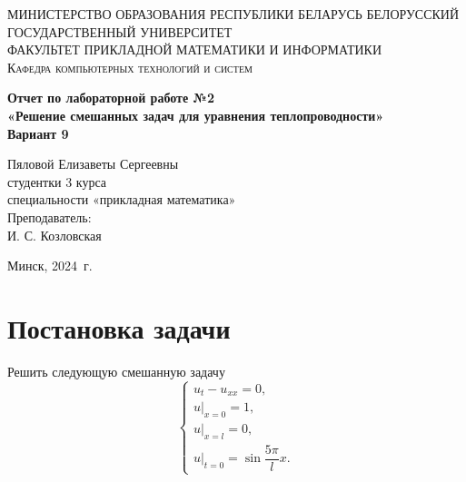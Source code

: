 \documentclass[a4paper, 12pt]{report}
\begin{document}
	\begin{titlepage}
		\begin{center}
			\textsc{МИНИСТЕРСТВО ОБРАЗОВАНИЯ РЕСПУБЛИКИ БЕЛАРУСЬ БЕЛОРУССКИЙ ГОСУДАРСТВЕННЫЙ УНИВЕРСИТЕТ
				\\[5mm]
				ФАКУЛЬТЕТ ПРИКЛАДНОЙ МАТЕМАТИКИ И ИНФОРМАТИКИ\\[2mm]
				Кафедра компьютерных технологий и систем
			}
			
			\vfill
			
			\textbf{Отчет по лабораторной работе №2\\
				«Решение смешанных задач для уравнения теплопроводности»\\
				Вариант 9
				\\[26mm]
			}
		\end{center}
		
		\hfill
		\begin{minipage}{.5\textwidth}
			\begin{flushright}
				Пяловой Елизаветы Сергеевны\\
				студентки 3 курса\\
				специальности «прикладная математика»\\[5mm]
				
				Преподаватель:\\[2mm] 
				И. С. Козловская\\
			\end{flushright}
		\end{minipage}%
		\vfill
		\begin{center}
			Минск, 2024\ г.
		\end{center}
	\end{titlepage}
	\newpage
	\section*{Постановка задачи}
	Решить следующую смешанную задачу 
	\begin{equation}
		\begin{cases}
		u_t - u_{xx} = 0,\\
		u|_{x=0} = 1,\\
		u|_{x=l} = 0,\\
		u|_{t=0} = \sin\dfrac{5\pi}{l}x.
	\end{cases}
	\end{equation}
\end{document}
